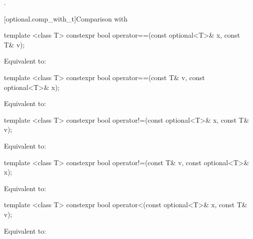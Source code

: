 \begin{itemdescr}
\pnum
\returns
{}.
\end{itemdescr}

[optional.comp_with_t]{Comparison with }

%
\begin{itemdecl}
template <class T> constexpr bool operator==(const optional<T>& x, const T& v);
\end{itemdecl}

\begin{itemdescr}
\pnum
\effects
Equivalent to: 
\end{itemdescr}

%
\begin{itemdecl}
template <class T> constexpr bool operator==(const T& v, const optional<T>& x);
\end{itemdecl}

\begin{itemdescr}
\pnum
\effects
Equivalent to: 
\end{itemdescr}

%
\begin{itemdecl}
template <class T> constexpr bool operator!=(const optional<T>& x, const T& v);
\end{itemdecl}

\begin{itemdescr}
\pnum
\effects
Equivalent to: 
\end{itemdescr}

%
\begin{itemdecl}
template <class T> constexpr bool operator!=(const T& v, const optional<T>& x);
\end{itemdecl}

\begin{itemdescr}
\pnum
\effects
Equivalent to: 
\end{itemdescr}

%
\begin{itemdecl}
template <class T> constexpr bool operator<(const optional<T>& x, const T& v);
\end{itemdecl}

\begin{itemdescr}
\pnum
\effects
Equivalent to: 
\end{itemdescr}

